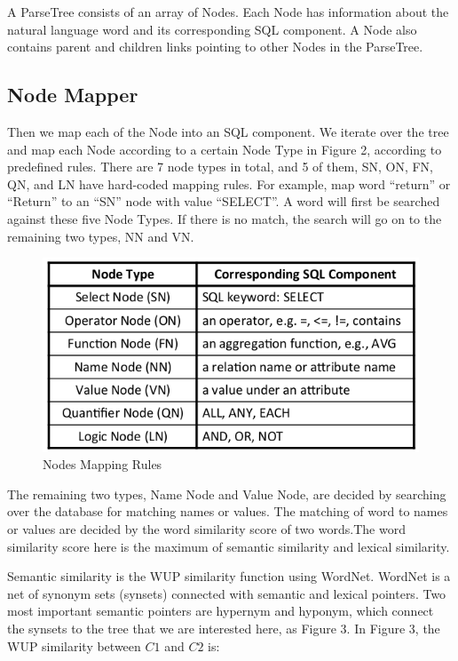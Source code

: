 \documentclass[twocolumn]{article}
\begin{document}
A ParseTree consists of an array of Nodes. Each Node has information about the natural language word and its corresponding SQL component. A Node also contains parent and children links pointing to other Nodes in the ParseTree.

\subsection{Node Mapper}
Then we map each of the Node into an SQL component. We iterate over the tree and map each Node according to a certain Node Type in Figure 2, according to predefined rules. There are 7 node types in total, and 5 of them, SN, ON, FN, QN, and LN have hard-coded mapping rules. For example, map word “return” or “Return” to an “SN” node with value “SELECT”. A word will first be searched against these five Node Types. If there is no match, the search will go on to the remaining two types, NN and VN.

\begin{figure}[ht]
  \centerline{\includegraphics[width=0.9\linewidth]{figures/nodes_mapping_rules.png}}
  \caption[caption for nodes mapping rules]{Nodes Mapping Rules\protect\footnotemark}
\end{figure}

The remaining two types, Name Node and Value Node, are decided by searching over the database for matching names or values. The matching of word to names or values are decided by the word similarity score of two words.The word similarity score here is the maximum of semantic similarity and lexical similarity.

Semantic similarity is the WUP similarity function using WordNet. WordNet is a net of synonym sets (synsets) connected with semantic and lexical pointers. Two most important semantic pointers are hypernym and hyponym, which connect the synsets to the tree that we are interested here, as Figure 3. In Figure 3, the WUP similarity between $C1$ and $C2$ is:
\end{document}
